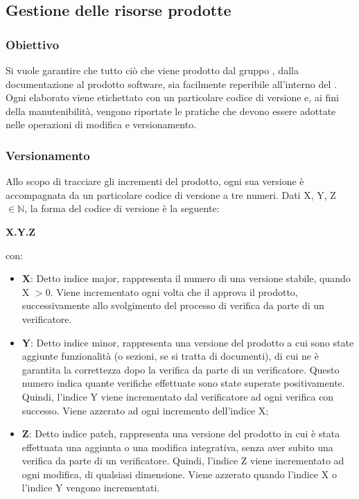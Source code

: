 \subsection{Gestione delle risorse prodotte}
\subsubsection{Obiettivo}
Si vuole garantire che tutto ciò che viene prodotto dal gruppo \Gruppo{}, dalla documentazione al prodotto software, sia facilmente reperibile all’interno del .
Ogni elaborato viene etichettato con un particolare codice di versione e, ai fini della manutenibilità, vengono riportate le pratiche che devono essere adottate nelle operazioni di modifica e versionamento.

\subsubsection{Versionamento}
Allo scopo di tracciare gli incrementi del prodotto, ogni sua versione è accompagnata da un particolare codice di versione a tre numeri. Dati X, Y, Z $\in \mathbb{N}$, la forma del codice di versione è la seguente:
\begin{center}
	\textbf{X.Y.Z}
\end{center}
con:
\begin{itemize}
	\item \textbf{X}: Detto indice major, rappresenta il numero di una versione stabile, quando X $> 0$.
	Viene incrementato ogni volta che il \Responsabile{} approva il prodotto, successivamente allo svolgimento del processo di verifica da parte di un verificatore.
	\item \textbf{Y}: Detto indice minor, rappresenta una versione del prodotto a cui sono state aggiunte funzionalità (o sezioni, se si tratta di documenti), di cui ne è garantita la correttezza dopo la verifica da parte di un verificatore.
	Questo numero indica quante verifiche effettuate sono state superate positivamente.
	Quindi, l'indice Y viene incrementato dal verificatore ad ogni verifica con successo.
	Viene azzerato ad ogni incremento dell'indice X;
	\item \textbf{Z}: Detto indice patch, rappresenta una versione del prodotto in cui è stata effettuata una aggiunta o una modifica integrativa, senza aver subito una verifica da parte di un verificatore.
	Quindi, l'indice Z viene incrementato ad ogni modifica, di qualsiasi dimensione.
	Viene azzerato quando l'indice X o l'indice Y vengono incrementati.
\end{itemize}


